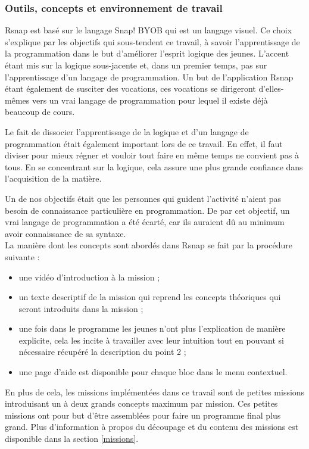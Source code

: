\subsubsection{Outils, concepts et environnement de travail} 
Rsnap est basé sur le langage Snap! BYOB qui est un langage visuel. Ce choix s'explique par les objectifs qui sous-tendent ce travail, à savoir l'apprentissage de la programmation dans le but d'améliorer l'esprit logique des jeunes. L'accent étant mis sur la logique sous-jacente et, dans un premier temps, pas sur l'apprentissage d'un langage de programmation. Un but de l'application Rsnap étant également de susciter des vocations, ces vocations se dirigeront d'elles-mêmes vers un vrai langage de programmation pour lequel il existe déjà beaucoup de cours. 

Le fait de dissocier l'apprentissage de la logique et d'un langage de programmation était également important lors de ce travail. En effet, il faut diviser pour mieux régner et vouloir tout faire en même temps ne convient pas à tous. En se concentrant sur la logique, cela assure une plus grande confiance dans l'acquisition de la matière.

Un de nos objectifs était que les personnes qui guident l'activité n'aient pas besoin de connaissance particulière en programmation. De par cet objectif, un vrai langage de programmation a été écarté, car ils auraient dû au minimum avoir connaissance de sa syntaxe.\\

La manière dont les concepts sont abordés dans Rsnap se fait par la procédure suivante :
\begin{itemize}
	\item une vidéo d'introduction à la \gls{mission} ;
	\item un texte descriptif de la \gls{mission} qui reprend les concepts théoriques qui seront introduits dans la \gls{mission} ;
	\item une fois dans le programme les jeunes n'ont plus l'explication de manière explicite, cela les incite à travailler avec leur intuition tout en pouvant si nécessaire récupéré la description du point 2 ;
	\item une page d'aide est disponible pour chaque bloc dans le menu contextuel.
\end{itemize}

En plus de cela, les \glspl{mission} implémentées dans ce travail sont de petites \glspl{mission} introduisant un à deux grands concepts maximum par \gls{mission}. Ces petites \glspl{mission} ont pour but d'être assemblées pour faire un programme final plus grand. Plus d'information à propos du découpage et du contenu des \glspl{mission} est disponible dans la section \ref{missions}.\\

